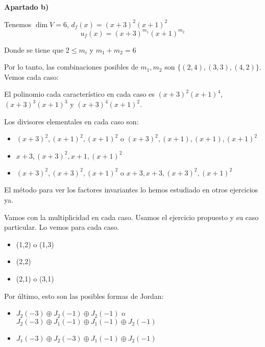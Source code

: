 \documentclass[openany]{book}
\begin{document}
\setcounter{ex}{27}
\begin{exercise}
$ $ 

\begin{flushright}
    \textbf{Apartado b)}
\end{flushright}

Tenemos $ \operatorname{dim}V = 6$, $ d_{f}(x) = (x+3)^2(x+1)^2$
$$ u_{f}(x) = (x+3)^{m_1}(x+1)^{m_2} $$

Donde se tiene que $ 2\leq m_i$ y $ m_1+m_2 = 6$

Por lo tanto, las combinaciones posibles de $ m_1,m_2$ son $ \{(2,4),(3,3),(4,2)\}$. Vemos cada caso:

El polinomio cada característico en cada caso es $ (x+3)^2(x+1)^{4}$, $ (x+3)^3(x+1)^3$ y $ (x+3)^{4}(x+1)^2$.

Los divisores elementales en cada caso son:
\begin{itemize}
    \item $ (x+3)^2,(x+1)^2,(x+1)^2$ o $ (x+3)^2,(x+1),(x+1),(x+1)^2$
    \item $ x+3,(x+3)^2,x+1,(x+1)^2$
    \item $ (x+3)^2,(x+3)^2,(x+1)^2$ o $ x+3,x+3,(x+3)^2,(x+1)^2$
\end{itemize}

El método para ver los factores invariantes lo hemos estudiado en otros ejercicios ya.

Vamos con la multiplicidad en cada caso. Usamos el ejercicio propuesto y su caso particular. Lo vemos para cada caso.

\begin{itemize}
    \item (1,2) o (1,3)
    \item (2,2)
    \item (2,1) o (3,1)
\end{itemize}

Por último, esto son las posibles formas de Jordan:

\begin{itemize}
    \item $ J_2(-3) \oplus J_2(-1) \oplus J_2(-1)$ o $ J_2(-3) \oplus J_1(-1) \oplus J_1(-1) \oplus J_2(-1)$
    \item $ J_1(-3) \oplus J_2(-3) \oplus J_1(-1) \oplus J_2(-1)$ 
\end{itemize}

\end{exercise}
\end{document}

